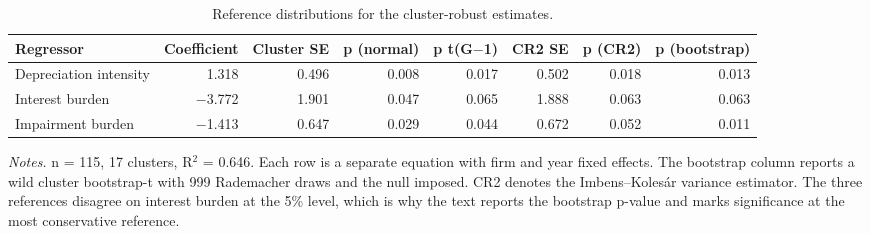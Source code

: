 \documentclass[review,3p,times]{elsarticle}
\begin{document}
\begin{table}[!htbp]
\centering
\renewcommand{\thetable}{A7}
\caption{Reference distributions for the cluster-robust estimates.}\label{tab:A7}
\begin{minipage}{\textwidth}
\centering
\footnotesize
\begin{adjustbox}{max width=\textwidth}
\begin{tabular}{@{}lrrrrrrr@{}}
\toprule
Regressor & Coefficient & Cluster SE & p (normal) & p t(G\ensuremath{-}1) & CR2 SE & p (CR2) & p (bootstrap) \\
\midrule
Depreciation intensity & 1.318 & 0.496 & 0.008 & 0.017 & 0.502 & 0.018 & 0.013 \\
Interest burden & \ensuremath{-}3.772 & 1.901 & 0.047 & 0.065 & 1.888 & 0.063 & 0.063 \\
Impairment burden & \ensuremath{-}1.413 & 0.647 & 0.029 & 0.044 & 0.672 & 0.052 & 0.011 \\
\bottomrule
\end{tabular}
\end{adjustbox}
\par\medskip
\raggedright
\noindent\textit{Notes.} n = 115, 17 clusters, R\ensuremath{^2} = 0.646. Each row is a separate equation with firm and year fixed effects. The bootstrap column reports a wild cluster bootstrap-t with 999 Rademacher draws and the null imposed. CR2 denotes the Imbens--Kolesár variance estimator. The three references disagree on interest burden at the 5\% level, which is why the text reports the bootstrap p-value and marks significance at the most conservative reference.
\end{minipage}
\end{table}
\end{document}
